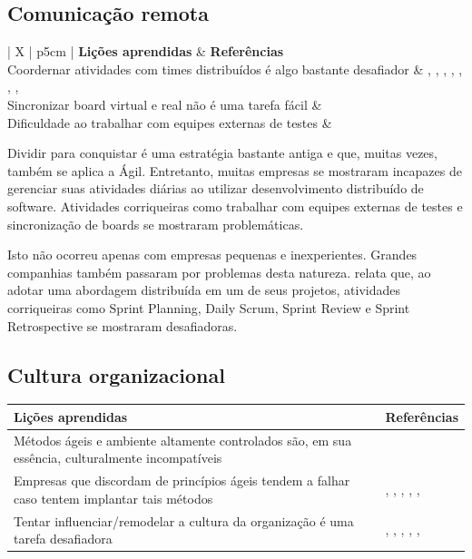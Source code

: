 \subsection{Comunicação remota}

\begin{table}[H]
	\centering
	\begin{tabularx}{\linewidth}{ | X | p{5cm} | } \hline \textbf{Lições aprendidas} & \textbf{Referências} \\ \hline
		Coordernar atividades com times distribuídos é algo bastante desafiador & \cite{Adobe2012}, \cite{Microsoft2013}, \cite{Korhonen2010}, \cite{Radha2012}, \cite{Rodrigues2013}, \cite{Vieira2013}, \cite{Bastos2013}, \cite{Maciel2013} \\ \hline
		Sincronizar board virtual e real não é uma tarefa fácil & \cite{Vieira2013} \\ \hline
		Dificuldade ao trabalhar com equipes externas de testes & \cite{Bastos2013} \\ \hline
	\end{tabularx}
\end{table}

Dividir para conquistar é uma estratégia bastante antiga e que, muitas vezes, também se aplica a Ágil. Entretanto, muitas empresas se mostraram incapazes de gerenciar suas atividades diárias ao utilizar desenvolvimento distribuído de software. Atividades corriqueiras como trabalhar com equipes externas de testes \cite{Bastos2013} e sincronização de boards \cite{Vieira2013} se mostraram problemáticas.

Isto não ocorreu apenas com empresas pequenas e inexperientes. Grandes companhias também passaram por problemas desta natureza. \cite{Adobe2012} relata que, ao adotar uma abordagem distribuída em um de seus projetos, atividades corriqueiras como Sprint Planning, Daily Scrum, Sprint Review e Sprint Retrospective se mostraram desafiadoras.

\subsection{Cultura organizacional}

\begin{table}[H]
	\centering
	\begin{tabularx}{\linewidth}{ | X | p{5cm} | } \hline \textbf{Lições aprendidas} & \textbf{Referências} \\ \hline
		Métodos ágeis e ambiente altamente controlados são, em sua essência, culturalmente incompatíveis & \cite{Fitzgerald2013} \\ \hline
		Empresas que discordam de princípios ágeis tendem a falhar caso tentem implantar tais métodos & \cite{Bustard2013}, \cite{Microsoft2013}, \cite{Claudia2013}, \cite{Nokia2013}, \cite{Sahota2012}, \cite{Maciel2013} \\ \hline
		Tentar influenciar/remodelar a cultura da organização é uma tarefa desafiadora & \cite{Eunha2012}, \cite{Rodrigues2013}, \cite{Bastos2013}, \cite{Sahota2012}, \cite{Srinath2012}, \cite{Maciel2013} \\ \hline
	\end{tabularx}
\end{table}


